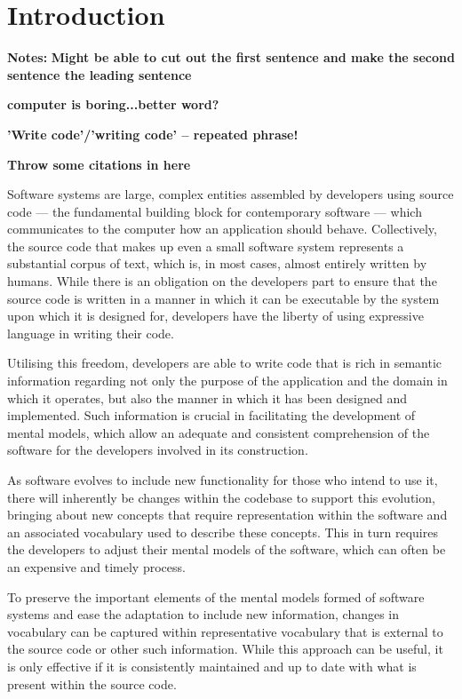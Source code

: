 \chapter{Introduction}
\label{chapter:Introduction} 

\textbf{Notes:}
\textbf{Might be able to cut out the first sentence and make the second sentence the leading sentence}

\textbf{computer is boring...better word?}

\textbf{'Write code'/'writing code' -- repeated phrase!}

\textbf{Throw some citations in here}

Software systems are large, complex entities assembled by developers using source code --- the fundamental building block for contemporary software --- which communicates to the computer how an application should behave. Collectively, the source code that makes up even a small software system represents a substantial corpus of text, which is, in most cases, almost entirely written by humans. While there is an obligation on the developers part to ensure that the source code is written in a manner in which it can be executable by the system upon which it is designed for, developers have the liberty of using expressive language in writing their code.

Utilising this freedom, developers are able to write code that is rich in semantic information regarding not only the purpose of the application and the domain in which it operates, but also the manner in which it has been designed and implemented. Such information is crucial in facilitating the development of mental models, which allow an adequate and consistent comprehension of the software for the developers involved in its construction.


As software evolves to include new functionality for those who intend to use it, there will inherently be changes within the codebase to support this evolution, bringing about new concepts that require representation within the software and an associated vocabulary used to describe these concepts. This in turn requires the developers to adjust their mental models of the software, which can often be an expensive and timely process.

To preserve the important elements of the mental models formed of software systems and ease the adaptation to include new information, changes in vocabulary can be captured within representative vocabulary that is external to the source code or other such information. While this approach can be useful, it is only effective if it is consistently maintained and up to date with what is present within the source code.

